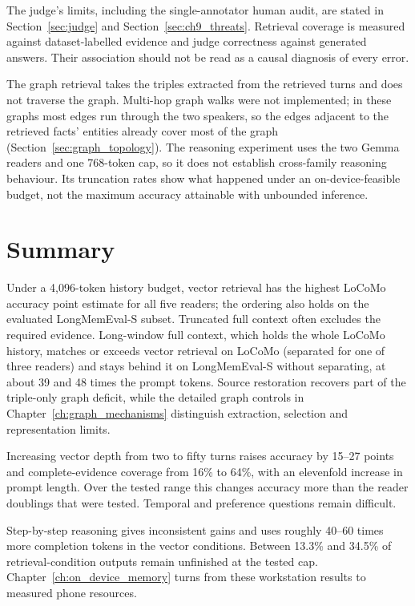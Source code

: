 The judge's limits, including the single-annotator human audit, are stated in
Section~\ref{sec:judge} and Section~\ref{sec:ch9_threats}. Retrieval coverage is measured against
dataset-labelled evidence and judge correctness against generated answers. Their association
should not be read as a causal diagnosis of every error.

The graph retrieval takes the triples extracted from the retrieved turns and does not traverse
the graph. Multi-hop graph walks were not implemented; in these graphs most edges run through the
two speakers, so the edges adjacent to the retrieved facts' entities already cover most of the
graph (Section~\ref{sec:graph_topology}). The reasoning experiment uses the two Gemma readers and
one 768-token cap, so it does not establish cross-family reasoning behaviour. Its truncation rates
show what happened under an on-device-feasible budget, not the maximum accuracy attainable with
unbounded inference.

\section{Summary}
\label{sec:ch4_summary}

Under a 4,096-token history budget, vector retrieval has the highest LoCoMo accuracy point
estimate for all five readers; the ordering also holds on the evaluated LongMemEval-S subset.
Truncated full context often excludes the required evidence. Long-window full context, which holds
the whole LoCoMo history, matches or exceeds vector retrieval on LoCoMo (separated for one of three
readers) and stays behind it on LongMemEval-S without separating, at about 39 and 48 times the
prompt tokens. Source restoration recovers part of the triple-only
graph deficit, while the detailed graph controls in Chapter~\ref{ch:graph_mechanisms}
distinguish extraction, selection and representation limits.

Increasing vector depth from two to fifty turns raises accuracy by 15--27 points and
complete-evidence coverage from 16\% to 64\%, with an elevenfold increase in prompt length.
Over the tested range this changes accuracy more than the reader doublings that were tested.
Temporal and preference questions remain difficult.

Step-by-step reasoning gives inconsistent gains and uses roughly 40--60 times more
completion tokens in the vector conditions. Between 13.3\% and 34.5\% of retrieval-condition
outputs remain unfinished at the tested cap. Chapter~\ref{ch:on_device_memory} turns from these
workstation results to measured phone resources.
